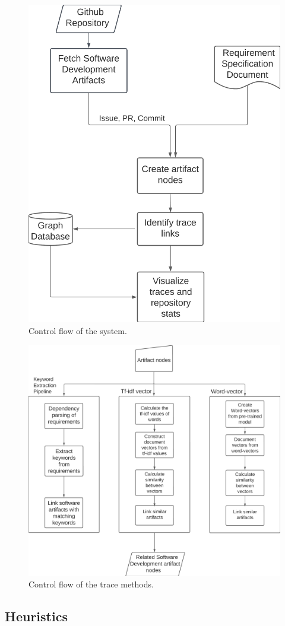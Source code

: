 \documentclass[conference]{IEEEtran}
\begin{document}
\begin{figure}[htb]
    \centering
    \includegraphics[width=0.45\linewidth]{figs/toolflow.png}
    \caption{Control flow of the system.}
    \label{fig:enter-label}
\end{figure}

\begin{figure}[htb]
    \centering
    \includegraphics[width=0.6\linewidth]{figs/tracemethods.png}
    \caption{Control flow of the trace methods.}
    \label{fig:enter-label}
\end{figure}


\subsection{Heuristics}
\label{sec:heuristics} 
\end{document}
